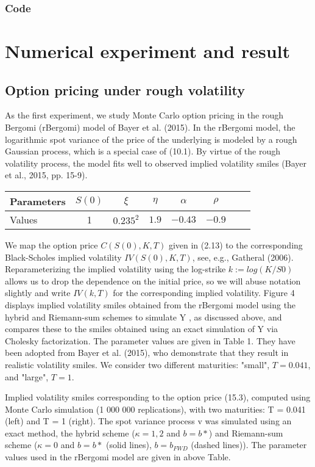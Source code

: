 \documentclass[12pt]{article}
\numberwithin{equation}{section}
\begin{document}
      \subsubsection{Code}
      
            
\section{Numerical experiment and result}

\subsection{Option pricing under rough volatility}

As the first experiment, we study Monte Carlo option pricing in the rough Bergomi (rBergomi) model of Bayer et al. (2015). In the rBergomi model, the logarithmic spot variance of the price of the underlying is modeled by a rough Gaussian process, which is a special case of (10.1). By virtue of the rough volatility process, the model fits well to observed implied volatility smiles (Bayer et al., 2015, pp. 15-9). \newline

\begin{tabular}{l*{6}{c}r}
Parameters & $S(0)$ & $\xi$ & $\eta$ & $\alpha$ & $\rho$ \\
\hline
Values & 1 & $0.235^2$ & $1.9$ & $-0.43$ & $-0.9$  \\
\end{tabular} \newline

We map the option price $C(S(0),K,T)$ given in (2.13) to the corresponding Black-Scholes implied volatility $IV(S(0),K,T)$, see, e.g., Gatheral (2006). Reparameterizing the implied volatility using the log-strike $k := log(K/S0)$ allows us to drop the dependence on the initial price, so we will abuse notation slightly and write $IV(k,T)$ for the corresponding implied volatility. Figure 4 displays implied volatility smiles obtained from the rBergomi model using the hybrid and Riemann-sum schemes to simulate Y , as discussed above, and compares these to the smiles obtained using an exact simulation of Y via Cholesky factorization. The parameter values are given in Table 1. They have been adopted from Bayer et al. (2015), who demonstrate that they result in realistic volatility smiles. We consider two different maturities: "small", $T = 0.041$, and "large", $T = 1$.

Implied volatility smiles corresponding to the option price (15.3), computed using Monte Carlo simulation (1 000 000 replications), with two maturities: T = 0.041 (left) and T = 1 (right). The spot variance process v was simulated using an exact method, the hybrid scheme ($\kappa = 1, 2$ and $b = b*$) and Riemann-sum scheme ($\kappa = 0$ and $b = b*$ (solid lines), $b = b_{FWD}$ (dashed lines)). The parameter values used in the rBergomi model are given in above Table.
\end{document}
